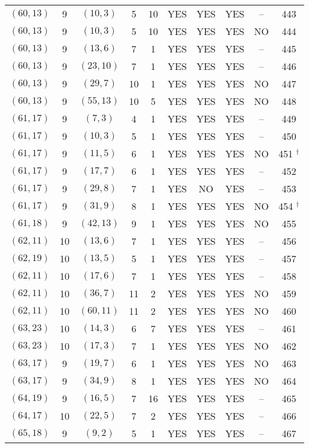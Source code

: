 \begin{longtable}{|c|c|c|c|c|c|c|c|c|c|}
$(60, 13)$ & 9 & $(10, 3)$ & 5 & 10 & YES & YES & YES & -- & 443\\
$(60, 13)$ & 9 & $(10, 3)$ & 5 & 10 & YES & YES & YES & NO & 444\\
$(60, 13)$ & 9 & $(13, 6)$ & 7 & 1 & YES & YES & YES & -- & 445\\
$(60, 13)$ & 9 & $(23, 10)$ & 7 & 1 & YES & YES & YES & -- & 446\\
$(60, 13)$ & 9 & $(29, 7)$ & 10 & 1 & YES & YES & YES & NO & 447\\
$(60, 13)$ & 9 & $(55, 13)$ & 10 & 5 & YES & YES & YES & NO & 448\\
$(61, 17)$ & 9 & $(7, 3)$ & 4 & 1 & YES & YES & YES & -- & 449\\
$(61, 17)$ & 9 & $(10, 3)$ & 5 & 1 & YES & YES & YES & -- & 450\\
$(61, 17)$ & 9 & $(11, 5)$ & 6 & 1 & YES & YES & YES & NO & 451 ${}^\dagger$\\
$(61, 17)$ & 9 & $(17, 7)$ & 6 & 1 & YES & YES & YES & -- & 452\\
$(61, 17)$ & 9 & $(29, 8)$ & 7 & 1 & YES & NO & YES & -- & 453\\
$(61, 17)$ & 9 & $(31, 9)$ & 8 & 1 & YES & YES & YES & NO & 454 ${}^\dagger$\\
$(61, 18)$ & 9 & $(42, 13)$ & 9 & 1 & YES & YES & YES & NO & 455\\
$(62, 11)$ & 10 & $(13, 6)$ & 7 & 1 & YES & YES & YES & -- & 456\\
$(62, 19)$ & 10 & $(13, 5)$ & 5 & 1 & YES & YES & YES & -- & 457\\
$(62, 11)$ & 10 & $(17, 6)$ & 7 & 1 & YES & YES & YES & -- & 458\\
$(62, 11)$ & 10 & $(36, 7)$ & 11 & 2 & YES & YES & YES & NO & 459\\
$(62, 11)$ & 10 & $(60, 11)$ & 11 & 2 & YES & YES & YES & NO & 460\\
$(63, 23)$ & 10 & $(14, 3)$ & 6 & 7 & YES & YES & YES & -- & 461\\
$(63, 23)$ & 10 & $(17, 3)$ & 7 & 1 & YES & YES & YES & NO & 462\\
$(63, 17)$ & 9 & $(19, 7)$ & 6 & 1 & YES & YES & YES & NO & 463\\
$(63, 17)$ & 9 & $(34, 9)$ & 8 & 1 & YES & YES & YES & NO & 464\\
$(64, 19)$ & 9 & $(16, 5)$ & 7 & 16 & YES & YES & YES & -- & 465\\
$(64, 17)$ & 10 & $(22, 5)$ & 7 & 2 & YES & YES & YES & -- & 466\\
$(65, 18)$ & 9 & $(9, 2)$ & 5 & 1 & YES & YES & YES & -- & 467\\

\end{longtable}

